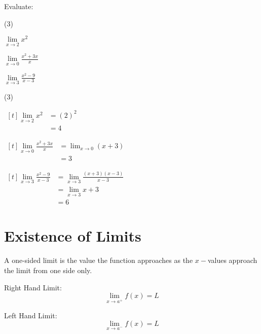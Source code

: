 \documentclass[11pt,a4paper]{book}
\begin{document}
\begin{example}

Evaluate:

\begin{tasks}[label=(\alph*),label-width=3.5ex] (3)

\task  $\mathop{\lim}\limits _{x\to2}x^{2}$

\task  ${\displaystyle \mathop{\lim}\limits _{x\to0}\frac{x^{2}+3x}{x}}$

\task  ${\displaystyle \mathop{\lim}\limits _{x\to3}\frac{x^{2}-9}{x-3}}$

\end{tasks}

\Solution

\begin{tasks}[label=(\alph*),label-width=3.5ex] (3)

\task
$
\begin{aligned}[t]
\mathop{\lim}\limits _{x\to2}x^{2} & =\left(2\right)^{2}\\
 & =4
\end{aligned}
$

\task
$
\begin{aligned}[t]
{\displaystyle \mathop{\lim}\limits _{x\to0}\frac{x^{2}+3x}{x}} & =\lim_{x\to0}\left(x+3\right)\\
 & =3
\end{aligned}
$

\task
$
\begin{aligned}[t]
{\displaystyle \mathop{\lim}\limits _{x\to3}\frac{x^{2}-9}{x-3}} & =\mathop{\lim}\limits _{x\to3}\frac{\left(x+3\right)\left(x-3\right)}{x-3}\\
 & =\mathop{\lim}\limits _{x\to3}x+3\\
 & =6
\end{aligned}
$

\end{tasks}

\end{example}


\section{Existence of Limits}

A one-sided limit is the value the function approaches as the $x-$values approach the limit from one side only.

Right Hand Limit:
\[
{\displaystyle \lim_{x\rightarrow a^{+}}f\left(x\right)={\displaystyle L}}
\]

Left Hand Limit:
\[
{\displaystyle \lim_{x\rightarrow a^{-}}f\left(x\right)={\displaystyle L}}
\]
\end{document}
